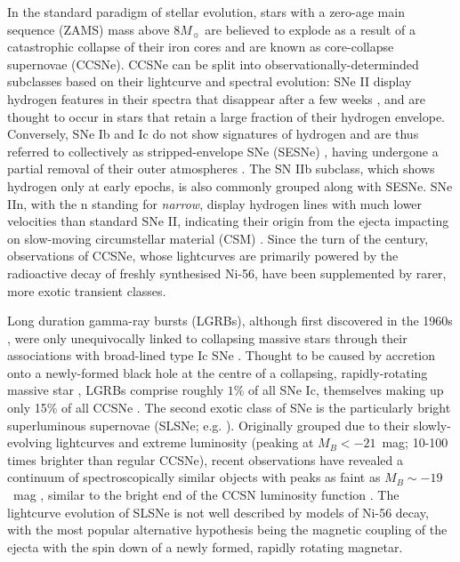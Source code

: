 \documentclass[fleqn,usenatbib,]{mnras}
\newcommand{\replylluis}[1]{\color{green}#1 \color{black}}
\begin{document}
In the standard paradigm of stellar evolution, stars with a zero-age main sequence (ZAMS) mass above $8M_{\sun}$ are believed to explode as a result of a catastrophic collapse of their iron cores and are known as core-collapse supernovae (CCSNe). CCSNe can be split into observationally-determinded subclasses based on their lightcurve and spectral evolution: SNe II display hydrogen features in their spectra \replylluis{that disappear after a few weeks}, and are thought to occur in stars that retain a large fraction of their hydrogen envelope. Conversely, SNe Ib and Ic do not show signatures of hydrogen and are thus referred to collectively as stripped-envelope SNe (SESNe) \replylluis{, having undergone a partial removal of their outer atmospheres}. The SN IIb subclass, which shows hydrogen only at early epochs, is also commonly grouped along with SESNe. \replylluis{SNe IIn, with the n standing for \textit{narrow}, display hydrogen lines with much lower velocities than standard SNe II, indicating their origin from the ejecta impacting on slow-moving circumstellar material (CSM)}. Since the turn of the century, observations of CCSNe, whose lightcurves are primarily powered by the radioactive decay of freshly synthesised Ni-56, have been supplemented by rarer, more exotic transient classes.

 Long duration gamma-ray bursts (LGRBs), although first discovered in the 1960s \citep{Klebesadel1973}, were only unequivocally linked to collapsing massive stars through their associations with broad-lined type Ic SNe \citep{Galama1998,Hjorth2003}. Thought to be caused by accretion onto a newly-formed black hole at the centre of a collapsing, rapidly-rotating massive star \citep[e.g.][]{Woosley1993,Woosley2006a,Woosley2006b}, LGRBs comprise roughly $1\%$ of all SNe Ic, themselves making up only 15\% of all CCSNe \citep{Kelly2012,Graham2016}. The second exotic class of SNe is the particularly bright superluminous supernovae (SLSNe; e.g. \citealt{Quimby2011, Gal-Yam2012}). Originally grouped due to their slowly-evolving lightcurves and extreme luminosity (peaking at $M_B < -21$~mag; 10-100 times brighter than regular CCSNe), recent observations have revealed a continuum of spectroscopically similar objects with peaks as faint as $M_B \sim -19$~mag \citep{DeCia2018,Lunnan2018,Angus2019}, similar to the bright end of the CCSN luminosity function \citep{Li2011}. The lightcurve evolution of SLSNe is not well described by models of Ni-56 decay, with the most popular alternative hypothesis being the magnetic coupling of the ejecta with the spin down of a newly formed, rapidly rotating magnetar.
 
\end{document}
